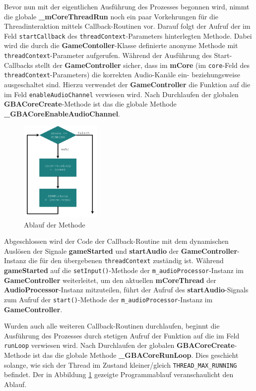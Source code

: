 \documentclass[11pt,a4paper]{scrartcl}
\begin{document}
Bevor nun mit der eigentlichen Ausf\"uhrung des Prozesses begonnen wird, nimmt die globale \textbf{{\_}mCoreThreadRun} noch ein paar Vorkehrungen f\"ur die Threadinteraktion mittels Callback-Routinen vor. Darauf folgt der Aufruf der im Feld \verb|startCallback| des \verb|threadContext|-Parameters hinterlegten Methode. Dabei wird die durch die \textbf{GameContoller}-Klasse definierte anonyme Methode mit \verb|threadContext|-Parameter aufgerufen. W\"ahrend der Ausf\"uhrung des Start-Callbacks stellt der \textbf{GameController} sicher, dass im \textbf{mCore} (im \verb|core|-Feld des \verb|threadContext|-Parameters) die korrekten Audio-Kan\"ale ein- beziehungsweise ausgeschaltet sind. Hierzu verwendet der \textbf{GameController} die Funktion auf die im Feld \verb|enableAudioChannel| verwiesen wird. Nach Durchlaufen der globalen \textbf{GBACoreCreate}-Methode ist das die globale Methode \textbf{{\_}GBACoreEnableAudioChannel}.

\begin{figure}
    \centering
    \vspace{-7mm}
    \includegraphics[width=0.35\textwidth]{Emulator_RunLoop}
    \caption{Ablauf der Methode}
    \label{fig:runloop}
\end{figure}

Abgeschlossen wird der Code der Callback-Routine mit dem dynamischen Ausl\"osen der Signale \textbf{gameStarted} und \textbf{startAudio} der \textbf{GameController}-Instanz die f\"ur den \"ubergebenen \verb|threadContext| zust\"andig ist. W\"ahrend \textbf{gameStarted} auf die \verb|setInput()|-Methode der \verb|m_audioProcessor|-Instanz im \textbf{GameController} weiterleitet, um den aktuellen \textbf{mCoreThread} der \textbf{AudioProcessor}-Instanz mitzuteilen, f\"uhrt der Aufruf des \textbf{startAudio}-Signals zum Aufruf der \verb|start()|-Methode der \verb|m_audioProcessor|-Instanz im \textbf{GameController}.

Wurden auch alle weiteren Callback-Routinen durchlaufen, beginnt die Ausf\"uhrung des Prozesses durch stetigen Aufruf der Funktion auf die im Feld \verb|runLoop| verwiesen wird. Nach Durchlaufen der globalen \textbf{GBACoreCreate}-Methode ist das die globale Methode \textbf{{\_}GBACoreRunLoop}. Dies geschieht solange, wie sich der Thread im Zustand kleiner/gleich \verb|THREAD_MAX_RUNNING| befindet. Der in Abbildung \ref{fig:runloop} gezeigte Programmablauf veranschaulicht den Ablauf.
\end{document}
